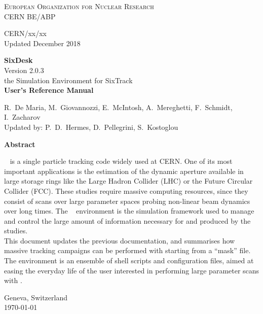 \begin{titlepage}
\begin{center}\normalsize\scshape
    European Organization for Nuclear Research \\
    CERN BE/ABP
\end{center}
\vspace*{2mm}
\begin{flushright}
    CERN/xx/xx \\
    Updated December 2018
\end{flushright}
\begin{center}\Huge
    \textbf{SixDesk} \\
    \LARGE Version 2.0.3 \\
    \vspace*{8mm} the Simulation Environment for SixTrack\\
    \vspace*{8mm}\textbf{User's Reference Manual}
\end{center}
\begin{center}
  R.~De Maria, M.~Giovannozzi, E.~McIntosh, A.~Mereghetti, F.~Schmidt,
  I.~Zacharov \\
    \vspace*{4mm}Updated by:
    P.~D.~Hermes, D.~Pellegrini, S.~Kostoglou
\end{center}
\begin{center}\large
    \vspace*{10mm}\textbf{Abstract} \\
\end{center}
\SIXTRACK{}~\cite{SixTrack_user_manual,SixPub,sixtrackWeb}
is a single particle tracking code widely used at CERN. One of its
most important applications is the estimation of the dynamic aperture available
in large storage rings like the Large Hadron Collider (LHC) or the Future
Circular Collider (FCC). These studies require massive computing resources,
since they consist of scans over large parameter spaces probing non-linear beam
dynamics over long times.
The \SIXDESK{}~\cite{SixDesk_original,SixDesk_updated} environment is the
simulation framework used to manage and control the large amount of
information necessary for and produced by the studies. \\
This document updates the previous documentation, and summarises how massive
tracking campaigns can be performed with \SIXTRACK{}
starting from a \MADX{} ``mask'' file.
The \SIXDESK{} environment is an ensemble of shell scripts and configuration
files, aimed at easing the everyday life of the user interested in performing
large parameter scans with \SIXTRACK{}.
\vfill
\begin{center}
    Geneva, Switzerland \\
    \today
\end{center}

\end{titlepage}
